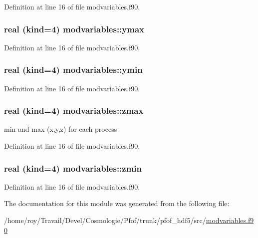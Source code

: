 Definition at line 16 of file modvariables.\-f90.

\hypertarget{classmodvariables_aa84922c68231d1c3496d3a7d210a62e7}{
\subsubsection[{ymax}]{\setlength{\rightskip}{0pt plus 5cm}real (kind=4) modvariables\-::ymax}}\label{classmodvariables_aa84922c68231d1c3496d3a7d210a62e7}


Definition at line 16 of file modvariables.\-f90.

\hypertarget{classmodvariables_af09b8e9f670d2074a46c55ed90661609}{
\subsubsection[{ymin}]{\setlength{\rightskip}{0pt plus 5cm}real (kind=4) modvariables\-::ymin}}\label{classmodvariables_af09b8e9f670d2074a46c55ed90661609}


Definition at line 16 of file modvariables.\-f90.

\hypertarget{classmodvariables_ab9a39f4e4f686b80011f46a2f88617c1}{
\subsubsection[{zmax}]{\setlength{\rightskip}{0pt plus 5cm}real (kind=4) modvariables\-::zmax}}\label{classmodvariables_ab9a39f4e4f686b80011f46a2f88617c1}


min and max (x,y,z) for each process 



Definition at line 16 of file modvariables.\-f90.

\hypertarget{classmodvariables_aa88314239681eb1c24673391f4612eb3}{
\subsubsection[{zmin}]{\setlength{\rightskip}{0pt plus 5cm}real (kind=4) modvariables\-::zmin}}\label{classmodvariables_aa88314239681eb1c24673391f4612eb3}


Definition at line 16 of file modvariables.\-f90.



The documentation for this module was generated from the following file\-:\begin{DoxyCompactItemize}
\item 
/home/roy/\-Travail/\-Devel/\-Cosmologie/\-Pfof/trunk/pfof\-\_\-hdf5/src/\hyperlink{pfof__hdf5_2src_2modvariables_8f90}{modvariables.\-f90}\end{DoxyCompactItemize}
